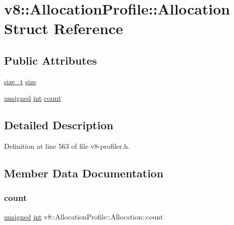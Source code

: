 \hypertarget{structv8_1_1AllocationProfile_1_1Allocation}{}\section{v8\+:\+:Allocation\+Profile\+:\+:Allocation Struct Reference}
\label{structv8_1_1AllocationProfile_1_1Allocation}
\subsection*{Public Attributes}
\begin{DoxyCompactItemize}
\item 
\mbox{\hyperlink{classsize__t}{size\+\_\+t}} \mbox{\hyperlink{structv8_1_1AllocationProfile_1_1Allocation_a346410fa5dfb796dff396069897c0aba}{size}}
\item 
\mbox{\hyperlink{classunsigned}{unsigned}} \mbox{\hyperlink{classint}{int}} \mbox{\hyperlink{structv8_1_1AllocationProfile_1_1Allocation_a012fe5238f5ebec039d7832f2d3ae8ed}{count}}
\end{DoxyCompactItemize}


\subsection{Detailed Description}


Definition at line 563 of file v8-\/profiler.\+h.



\subsection{Member Data Documentation}
\mbox{\label{structv8_1_1AllocationProfile_1_1Allocation_a012fe5238f5ebec039d7832f2d3ae8ed}} 
\subsubsection{\texorpdfstring{count}{count}}
{\footnotesize\ttfamily \mbox{\hyperlink{classunsigned}{unsigned}} \mbox{\hyperlink{classint}{int}} v8\+::\+Allocation\+Profile\+::\+Allocation\+::count}

